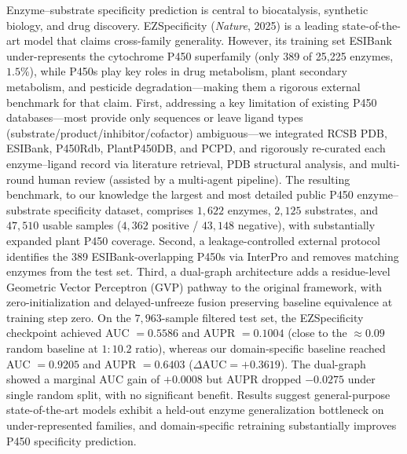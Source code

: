 \begin{abstract*}
  Enzyme--substrate specificity prediction is central to biocatalysis, synthetic biology, and drug discovery. EZSpecificity (\textit{Nature}, 2025) is a leading state-of-the-art model that claims cross-family generality. However, its training set ESIBank under-represents the cytochrome P450 superfamily (only 389 of 25{,}225 enzymes, $1.5\%$), while P450s play key roles in drug metabolism, plant secondary metabolism, and pesticide degradation---making them a rigorous external benchmark for that claim. First, addressing a key limitation of existing P450 databases---most provide only sequences or leave ligand types (substrate/product/inhibitor/cofactor) ambiguous---we integrated RCSB PDB, ESIBank, P450Rdb, PlantP450DB, and PCPD, and rigorously re-curated each enzyme--ligand record via literature retrieval, PDB structural analysis, and multi-round human review (assisted by a multi-agent pipeline). The resulting benchmark, to our knowledge the largest and most detailed public P450 enzyme--substrate specificity dataset, comprises $1{,}622$ enzymes, $2{,}125$ substrates, and $47{,}510$ usable samples ($4{,}362$ positive / $43{,}148$ negative), with substantially expanded plant P450 coverage. Second, a leakage-controlled external protocol identifies the 389 ESIBank-overlapping P450s via InterPro and removes matching enzymes from the test set. Third, a dual-graph architecture adds a residue-level Geometric Vector Perceptron (GVP) pathway to the original framework, with zero-initialization and delayed-unfreeze fusion preserving baseline equivalence at training step zero. On the $7{,}963$-sample filtered test set, the EZSpecificity checkpoint achieved AUC $= 0.5586$ and AUPR $= 0.1004$ (close to the $\approx 0.09$ random baseline at $1{:}10.2$ ratio), whereas our domain-specific baseline reached AUC $= 0.9205$ and AUPR $= 0.6403$ ($\Delta\mathrm{AUC} = +0.3619$). The dual-graph showed a marginal AUC gain of $+0.0008$ but AUPR dropped $-0.0275$ under single random split, with no significant benefit. Results suggest general-purpose state-of-the-art models exhibit a held-out enzyme generalization bottleneck on under-represented families, and domain-specific retraining substantially improves P450 specificity prediction.
\end{abstract*}

